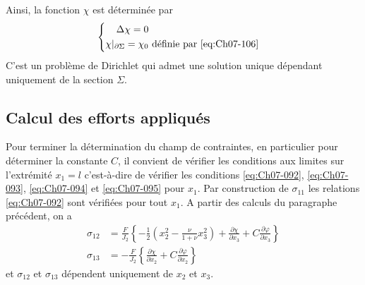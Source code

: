 Ainsi, la fonction $\chi$ est déterminée par 
\begin{equation}
    \left\{
    \begin{aligned}
        \Delta\chi = 0 \\
        \chi|_{\partial \Sigma} = \chi_0 & \text{ définie par \eqref{eq:Ch07-106}}
    \end{aligned}
    \right.
    \label{eq:Ch07-108}
\end{equation}
C'est un problème de Dirichlet qui admet une solution unique dépendant uniquement de la section $\Sigma$.

\subsection{Calcul des efforts appliqués} \label{ssec:Ch07-3.2}
Pour terminer la détermination du champ de contraintes, en particulier pour déterminer la constante $C$, il convient de vérifier les conditions aux limites sur l'extrémité $x_1 = l$ c'est-à-dire de vérifier les conditions \eqref{eq:Ch07-092}, \eqref{eq:Ch07-093}, \eqref{eq:Ch07-094} et \eqref{eq:Ch07-095} pour $x_1$.
Par construction de $\sigma_{11}$ les relations \eqref{eq:Ch07-092} sont 
vérifiées pour tout $x_1$.
A partir des calculs du paragraphe précédent, on a
\begin{equation}
    \begin{aligned}
        \sigma_{12} &= \frac{F}{J_2} \left\{ -\frac{1}{2} \left( x_2^2 - \frac{\nu}{1+\nu} x_3^2 \right) + \frac{\partial \chi}{\partial x_3} + C \frac{\partial \varphi}{\partial x_3} \right\} \\
        \sigma_{13} &= - \frac{F}{J_2} \left\{ \frac{\partial \chi}{\partial x_2} + C \frac{\partial \varphi}{\partial x_2} \right\}
    \end{aligned}
    \label{eq:Ch07-109}
\end{equation}
et $\sigma_{12}$ et $\sigma_{13}$ dépendent uniquement de $x_2$ et $x_3$.

